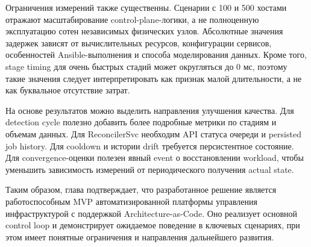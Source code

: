Ограничения измерений также существенны. Сценарии с 100 и 500 хостами отражают масштабирование control-plane-логики, а не полноценную эксплуатацию сотен независимых физических узлов. Абсолютные значения задержек зависят от вычислительных ресурсов, конфигурации сервисов, особенностей Ansible-выполнения и способа моделирования данных. Кроме того, stage timing для очень быстрых стадий может округляться до 0 мс, поэтому такие значения следует интерпретировать как признак малой длительности, а не как буквальное отсутствие затрат.

На основе результатов можно выделить направления улучшения качества. Для detection cycle полезно добавить более подробные метрики по стадиям и объемам данных. Для ReconcilerSvc необходим API статуса очереди и persisted job history. Для cooldown и истории drift требуется персистентное состояние. Для convergence-оценки полезен явный event о восстановлении workload, чтобы уменьшить зависимость измерений от периодического получения actual state.

Таким образом, глава подтверждает, что разработанное решение является работоспособным MVP автоматизированной платформы управления инфраструктурой с поддержкой Architecture-as-Code. Оно реализует основной control loop и демонстрирует ожидаемое поведение в ключевых сценариях, при этом имеет понятные ограничения и направления дальнейшего развития.
